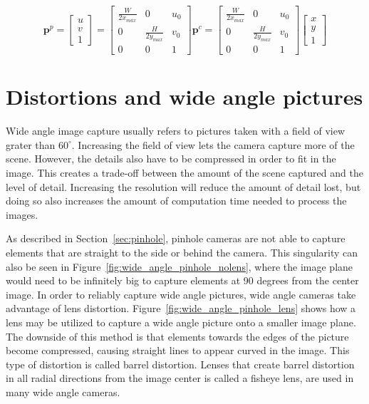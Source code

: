 \begin{equation}
    \mathbf{p}^p = \begin{bmatrix}
        u \\ v \\ 1
    \end{bmatrix} = \begin{bmatrix}
        \frac{W}{2x_{max}} & 0 & u_0 \\
        0 & \frac{H}{2y_{max}} & v_0 \\
        0 & 0 & 1
    \end{bmatrix} \mathbf{p}^c =
    \begin{bmatrix}
        \frac{W}{2x_{max}} & 0 & u_0 \\
        0 & \frac{H}{2y_{max}} & v_0 \\
        0 & 0 & 1
    \end{bmatrix}\begin{bmatrix}
        x \\ y \\ 1
    \end{bmatrix}
    \label{eq:pixel_transform}
\end{equation}

\section{Distortions and wide angle pictures}

Wide angle image capture usually refers to pictures taken with a field of view grater than $60^\circ$. Increasing the field of view lets the camera capture more of the scene. However, the details also have to be compressed in order to fit in the image. This creates a trade-off between the amount of the scene captured and the level of detail. Increasing the resolution will reduce the amount of detail lost, but doing so also increases the amount of computation time needed to process the images.

As described in Section~\ref{sec:pinhole}, pinhole cameras are not able to capture elements that are straight to the side or behind the camera. This singularity can also be seen in Figure~\ref{fig:wide_angle_pinhole_nolens}, where the image plane would need to be infinitely big to capture elements at 90 degrees from the center image. In order to reliably capture wide angle pictures, wide angle cameras take advantage of lens distortion. Figure~\ref{fig:wide_angle_pinhole_lens} shows how a lens may be utilized to capture a wide angle picture onto a smaller image plane. The downside of this method is that elements towards the edges of the picture become compressed, causing straight lines to appear curved in the image. This type of distortion is called barrel distortion. Lenses that create barrel distortion in all radial directions from the image center is called a fisheye lens, are used in many wide angle cameras.

